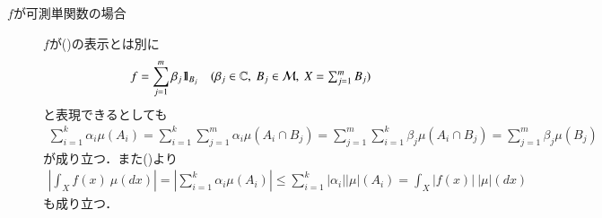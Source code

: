 	\begin{prf}\mbox{}
		\begin{description}
			\item[$f$が可測単関数の場合]
				$f$が()の表示とは別に
				\begin{align}
					f = \sum_{j=1}^{m} \beta_j \defunc_{B_j}
					\quad (\beta_j \in \C,\ B_j \in \mathcal{M},\ \mbox{$X=\sum_{j=1}^{m} B_j$})
				\end{align}
				と表現できるとしても
				\begin{align}
					\sum_{i=1}^{k} \alpha_i \mu(A_i)
					= \sum_{i=1}^{k} \sum_{j=1}^{m} \alpha_i \mu(A_i \cap B_j)
					= \sum_{j=1}^{m} \sum_{i=1}^{k} \beta_j \mu(A_i \cap B_j)
					= \sum_{j=1}^{m} \beta_j \mu(B_j)
				\end{align}
				が成り立つ．また()より
				\begin{align}
					\left| \int_X f(x)\ \mu(dx) \right|
					= \left| \sum_{i=1}^{k} \alpha_i \mu(A_i) \right|
					\leq \sum_{i=1}^{k} \left| \alpha_i \right| |\mu|(A_i)
					= \int_X |f(x)|\ |\mu|(dx)
					\label{eq:thm_complex_measure_integration_well_defined}
				\end{align}
				も成り立つ．
				

\end{description}
\end{prf}
